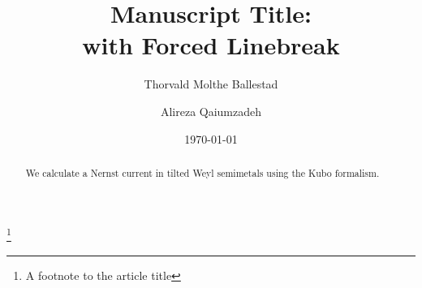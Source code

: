 \documentclass[%
 reprint,
 amsmath,amssymb,
 aps,
]{revtex4-2}
\begin{document}

\title{Manuscript Title:\\with Forced Linebreak}%
\thanks{A footnote to the article title}%

\author{Thorvald Molthe Ballestad}

\author{Alireza Qaiumzadeh}%
%




\date{\today}%

\begin{abstract}
  We calculate a Nernst current in tilted Weyl semimetals using the Kubo formalism.

\end{abstract}

\maketitle
\end{document}
